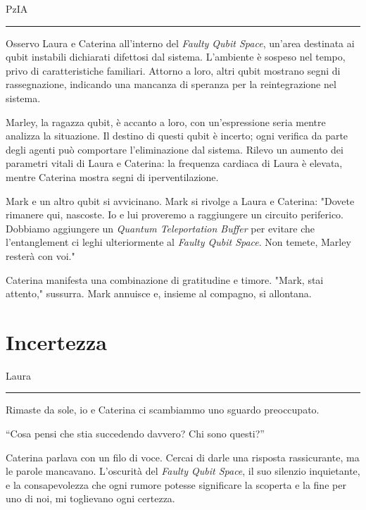 \vspace{1em}
\begin{center}PzIA\end{center}
\hrule
\vspace{1em}
Osservo Laura e Caterina all'interno del \textit{Faulty Qubit Space}, un'area destinata ai qubit instabili dichiarati difettosi dal sistema. L'ambiente è sospeso nel tempo, privo di caratteristiche familiari. Attorno a loro, altri qubit mostrano segni di rassegnazione, indicando una mancanza di speranza per la reintegrazione nel sistema.

Marley, la ragazza qubit, è accanto a loro, con un'espressione seria mentre analizza la situazione. Il destino di questi qubit è incerto; ogni verifica da parte degli agenti può comportare l'eliminazione dal sistema. Rilevo un aumento dei parametri vitali di Laura e Caterina: la frequenza cardiaca di Laura è elevata, mentre Caterina mostra segni di iperventilazione.

Mark e un altro qubit si avvicinano. Mark si rivolge a Laura e Caterina: "Dovete rimanere qui, nascoste. Io e lui proveremo a raggiungere un circuito periferico. Dobbiamo aggiungere un \textit{Quantum Teleportation Buffer} per evitare che l'entanglement ci leghi ulteriormente al \textit{Faulty Qubit Space}. Non temete, Marley resterà con voi." 

Caterina manifesta una combinazione di gratitudine e timore. "Mark, stai attento," sussurra. Mark annuisce e, insieme al compagno, si allontana.
\newpage
\section{Incertezza}
\vspace{1em}
\begin{center}Laura\end{center}
\hrule
\vspace{1em}
Rimaste da sole, io e Caterina ci scambiammo uno sguardo preoccupato. 

\begin{dialogue}
 \enquote{Cosa pensi che stia succedendo davvero? Chi sono questi?}
\end{dialogue}

Caterina parlava con un filo di voce.
Cercai di darle una risposta rassicurante, ma le parole mancavano. L'oscurità del \textit{Faulty Qubit Space}, il suo silenzio inquietante, e la consapevolezza che ogni rumore potesse significare la scoperta e la fine per uno di noi, mi toglievano ogni certezza.

